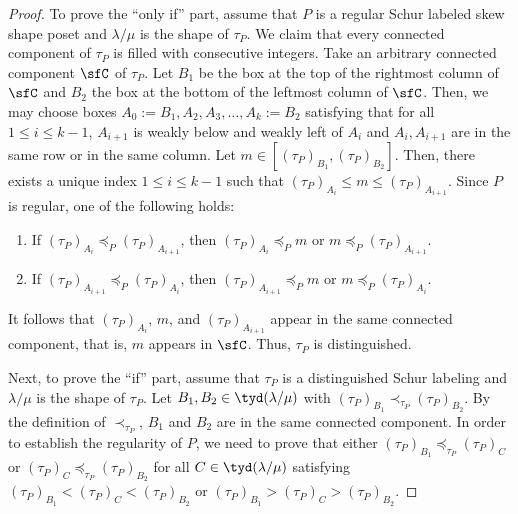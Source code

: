 \documentclass[12pt, reqno]{amsart}
\theoremstyle{definition}
\numberwithin{equation}{section} \numberwithin{figure}{section}
\numberwithin{table}{section}
\begin{document}
\begin{proof}
To prove the ``only if'' part, assume that $P$ is a regular Schur labeled skew shape poset and $\lambda / \mu$ is the shape of $\tau_P$.
We claim that every connected component of $\tau_P$ is filled with consecutive integers.
Take an arbitrary connected component $\sfC$ of $\tau_P$.
Let $B_1$ be the box at the top of the rightmost column of $\sfC$ and $B_2$ the box at the bottom of the leftmost column of $\sfC$. 
Then, we may choose boxes $A_0:= B_1, A_2, A_3, \ldots, A_k := B_2$ satisfying that for all $1 \le i \le k-1$, $A_{i+1}$ is  weakly below and weakly left of $A_i$ and $A_{i}, A_{i+1}$ are in the same row or in the same column.
Let $m \in [(\tau_P)_{B_1}, (\tau_P)_{B_2}]$.
Then, there exists a unique index $1 \leq i \leq k-1$ such that $(\tau_P)_{A_i} \leq m \leq (\tau_P)_{A_{i+1}}$.
Since $P$ is regular, one of the following holds:
\begin{enumerate}[label = {\rm (\roman*)}]
\item 
If $(\tau_P)_{A_i} \preceq_P (\tau_P)_{A_{i+1}}$, then $(\tau_P)_{A_i} \preceq_P m$ or $m \preceq_P (\tau_P)_{A_{i+1}}$.
\item 
If $(\tau_P)_{A_{i+1}} \preceq_P (\tau_P)_{A_{i}}$, then $(\tau_P)_{A_{i+1}} \preceq_P m$ or $m \preceq_P (\tau_P)_{A_{i}}$.
\end{enumerate}
It follows that $(\tau_P)_{A_i}$, $m$, and $(\tau_P)_{A_{i+1}}$ appear in the same connected component, that is, $m$ appears in $\sfC$.
Thus, $\tau_P$ is distinguished.


Next, to prove the ``if'' part, assume that $\tau_P$ is a distinguished Schur labeling and $\lambda / \mu$ is the shape of $\tau_P$.
Let $B_1, B_2 \in \tyd(\lambda/\mu)$ with $(\tau_P)_{B_1} \prec_{\tau_P} (\tau_P)_{B_2}$.
By the definition of $\prec_{\tau_P}$, $B_1$ and $B_2$ are in the same connected component.
In order to establish the regularity of $P$, we need to prove that either $(\tau_P)_{B_1} \preceq_{\tau_P} (\tau_P)_C$ or $(\tau_P)_{C} \preceq_{\tau_P} (\tau_P)_{B_2}$ for all $C \in \tyd(\lambda/\mu)$ satisfying $(\tau_P)_{B_1} < (\tau_P)_C < (\tau_P)_{B_2}$ or $(\tau_P)_{B_1} > (\tau_P)_C > (\tau_P)_{B_2}$.


\end{proof}
\end{document}
